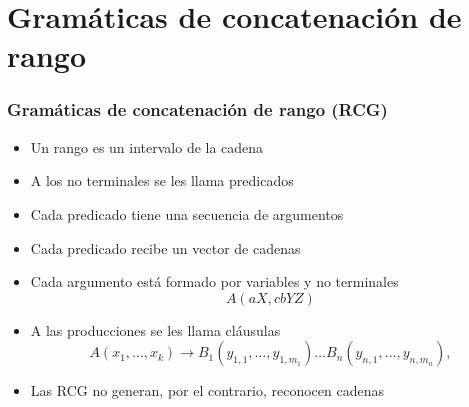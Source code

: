 \documentclass{beamer}
\begin{document}
\section{Gramáticas de concatenación de rango}
\begin{frame}
    \frametitle{Gramáticas de concatenación de rango (RCG)}
    
    \begin{itemize}
        \item Un rango es un intervalo de la cadena
              \pause
        \item A los no terminales se les llama predicados
              \pause
        \item Cada predicado tiene una secuencia de argumentos
              \pause        
        \item Cada predicado recibe un vector de cadenas
              \pause
        \item Cada argumento está formado por variables y no terminales
              $$A(aX,cbYZ)$$
              \pause
        \item A las producciones se les llama cláusulas
              \[
                  A(x_1, \ldots, x_k) \to B_1(y_{1,1}, \ldots, y_{1,m_1}) \ldots B_n(y_{n,1}, \ldots, y_{n,m_n}),
              \]
              \pause
        \item Las RCG no generan, por el contrario, reconocen cadenas
              
              
    \end{itemize}
\end{frame}
\end{document}
